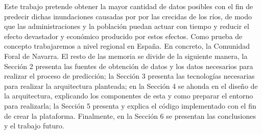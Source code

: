 Este trabajo pretende obtener la mayor cantidad de datos posibles con el fin de predecir dichas inundaciones causadas por por las crecidas de los ríos, de modo que las administraciones y la población puedan actuar con tiempo y reducir el efecto devastador y económico producido por estos efectos. Como prueba de concepto trabajaremos a nivel regional en España. En concreto, la Comunidad Foral de Navarra.\newline
\newline
El resto de las memoria se divide de la siguiente manera, la Sección 2 presenta las fuentes de obtención de datos y los datos necesarios para realizar el proceso de predicción; la Sección 3 presenta las tecnologías necesarias para realizar la arquitectura planteada; en la Sección 4 se ahonda en el diseño de la arquitectura, explicando los componentes de esta y como preparar el entorno para realizarla; la Sección 5 presenta y explica el código implementado con el fin de crear la plataforma. Finalmente, en la Sección 6 se presentan las conclusiones y el trabajo futuro.
